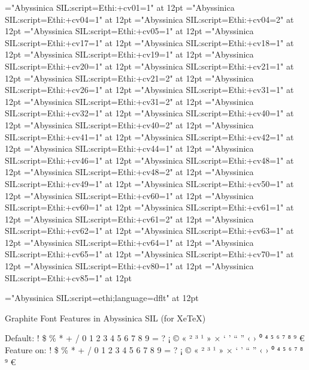 \font\OTone="Abyssinica SIL:script=Ethi:+cv01=1" at 12pt
\font\OTfourone="Abyssinica SIL:script=Ethi:+cv04=1" at 12pt
\font\OTfourtwo="Abyssinica SIL:script=Ethi:+cv04=2" at 12pt 
\font\OTfive="Abyssinica SIL:script=Ethi:+cv05=1" at 12pt
\font\OTseventeen="Abyssinica SIL:script=Ethi:+cv17=1" at 12pt 
\font\OTeighteen="Abyssinica SIL:script=Ethi:+cv18=1" at 12pt 
\font\OTnineteen="Abyssinica SIL:script=Ethi:+cv19=1" at 12pt
\font\OTtwenty="Abyssinica SIL:script=Ethi:+cv20=1" at 12pt 
\font\OTtwentyoneone="Abyssinica SIL:script=Ethi:+cv21=1" at 12pt
\font\OTtwentyonetwo="Abyssinica SIL:script=Ethi:+cv21=2" at 12pt 
\font\OTtwentysix="Abyssinica SIL:script=Ethi:+cv26=1" at 12pt
\font\OTthirtyoneone="Abyssinica SIL:script=Ethi:+cv31=1" at 12pt
\font\OTthirtyonetwo="Abyssinica SIL:script=Ethi:+cv31=2" at 12pt 
\font\OTthirtytwo="Abyssinica SIL:script=Ethi:+cv32=1" at 12pt
\font\OTfortyone="Abyssinica SIL:script=Ethi:+cv40=1" at 12pt
\font\OTfortytwo="Abyssinica SIL:script=Ethi:+cv40=2" at 12pt 
\font\OTfortyoneone="Abyssinica SIL:script=Ethi:+cv41=1" at 12pt
\font\OTfortytwoone="Abyssinica SIL:script=Ethi:+cv42=1" at 12pt
\font\OTfortyfive="Abyssinica SIL:script=Ethi:+cv44=1" at 12pt
\font\OTfortysix="Abyssinica SIL:script=Ethi:+cv46=1" at 12pt
\font\OTfortyeightone="Abyssinica SIL:script=Ethi:+cv48=1" at 12pt
\font\OTfortyeighttwo="Abyssinica SIL:script=Ethi:+cv48=2" at 12pt 
\font\OTfortynine="Abyssinica SIL:script=Ethi:+cv49=1" at 12pt
\font\OTfifty="Abyssinica SIL:script=Ethi:+cv50=1" at 12pt
\font\OTsixtyone="Abyssinica SIL:script=Ethi:+cv60=1" at 12pt
\font\OTsixtytwo="Abyssinica SIL:script=Ethi:+cv60=1" at 12pt 
\font\OTsixtyoneone="Abyssinica SIL:script=Ethi:+cv61=1" at 12pt
\font\OTsixtyonetwo="Abyssinica SIL:script=Ethi:+cv61=2" at 12pt 
\font\OTsixtytwoone="Abyssinica SIL:script=Ethi:+cv62=1" at 12pt
\font\OTsixtythree="Abyssinica SIL:script=Ethi:+cv63=1" at 12pt
\font\OTsixtyfour="Abyssinica SIL:script=Ethi:+cv64=1" at 12pt
\font\OTsixtyfive="Abyssinica SIL:script=Ethi:+cv65=1" at 12pt 
\font\OTseventy="Abyssinica SIL:script=Ethi:+cv70=1" at 12pt
\font\OTeighty="Abyssinica SIL:script=Ethi:+cv80=1" at 12pt
\font\OTeightyfive="Abyssinica SIL:script=Ethi:+cv85=1" at 12pt

\font\C="Abyssinica SIL:script=ethi;language=dflt" at 12pt

\A Graphite Font Features in Abyssinica SIL (for XeTeX)

\IndSS Default: ! \$ \% * + / 0 1 2 3 4 5 6 7 8 9 = ? ¡ © « ² ³ ¹ » × ‘ ’ “ ” ‹ › ⁰ ⁴ ⁵ ⁶ ⁷ ⁸ ⁹ €
\IndSS\one Feature on: ! \$ \% * + / 0 1 2 3 4 5 6 7 8 9 = ? ¡ © « ² ³ ¹ » × ‘ ’ “ ” ‹ › ⁰ ⁴ ⁵ ⁶ ⁷ ⁸ ⁹ €


